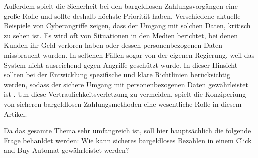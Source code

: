 Außerdem spielt die Sicherheit bei den bargeldlosen Zahlungsvorgängen eine große Rolle und sollte
deshalb höchste Priorität haben. Verschiedene aktuelle Beispiele von Cyberangriffe zeigen, dass der 
Umgang mit solchen Daten, kritisch zu sehen ist. Es wird oft von Situationen in den Medien berichtet,
bei denen Kunden ihr Geld verloren haben oder dessen personenbezogenen Daten missbraucht wurden. 
In seltenen Fällen sogar von der eigenen Regierung, weil das System nicht ausreichend gegen Angriffe 
geschützt wurde. In dieser Hinsicht sollten bei der Entwicklung spezifische und klare Richtlinien 
berücksichtig werden, sodass der sichere Umgang mit personenbezogenen Daten gewährleistet ist 
\cite{refart:TRVR}. Um diese Vertraulichkeitsverletzung zu vermeiden, spielt die Konziperiung von 
sicheren bargeldlosen Zahlungsmethoden eine wesentliche Rolle in diesem Artikel. 

Da das gesamte Thema sehr umfangreich ist, soll hier hauptsächlich die folgende Frage behanldet werden: 
Wie kann sicheres bargeldloses Bezahlen in einem Click and Buy Automat gewährleistet werden?